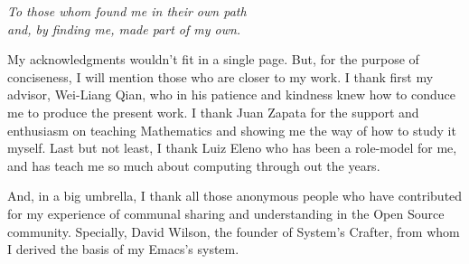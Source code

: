 \documentclass[
12pt,				%
openright,			%
oneside,			%
a4paper,			%
brazil,				%
english,			%
]{abntex2}
\begin{document}
\begin{dedicatoria}
   \vspace*{\fill}
   \centering
   \noindent
   \textit{To those whom found me in their own path\\
     and, by finding me, made part of my own.} \vspace*{\fill}
\end{dedicatoria}

\begin{agradecimentos}

  My acknowledgments wouldn't fit in a single page. But, for the purpose of conciseness, I will mention those who are closer to my work. I thank first my advisor, Wei-Liang Qian, who in his patience and kindness knew how to conduce me to produce the present work. I thank Juan Zapata for the support and enthusiasm on teaching Mathematics and showing me the way of how to study it myself. Last but not least, I thank Luiz Eleno who has been a role-model for me, and has teach me so much about computing through out the years.

  And, in a big umbrella, I thank all those anonymous people who have contributed for my experience of communal sharing and understanding in the Open Source community. Specially, David Wilson, the founder of System's Crafter, from whom I derived the basis of my Emacs's system. 
  
\end{agradecimentos}


\end{document}
